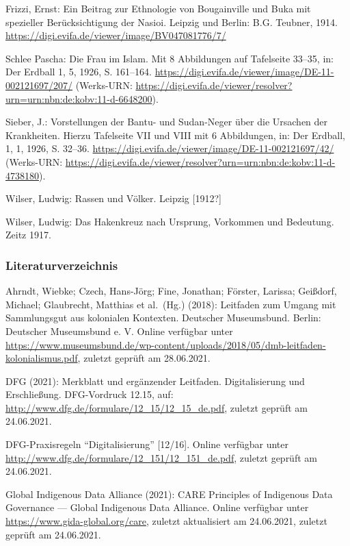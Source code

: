 \documentclass[a4paper,
fontsize=11pt,
oneside,
numbers=noperiodatend,
parskip=half-,
bibliography=totoc,
final
]{scrartcl}
\begin{document}
Frizzi, Ernst: Ein Beitrag zur Ethnologie von Bougainville und Buka mit
spezieller Berücksichtigung der Nasioi. Leipzig und Berlin: B.G.
Teubner, 1914. \url{https://digi.evifa.de/viewer/image/BV047081776/7/}

Schlee Pascha: Die Frau im Islam. Mit 8 Abbildungen auf Tafelseite
33--35, in: Der Erdball 1, 5, 1926, S. 161--164.
\url{https://digi.evifa.de/viewer/image/DE-11-002121697/207/}
(Werks-URN:
\url{https://digi.evifa.de/viewer/resolver?urn=urn:nbn:de:kobv:11-d-6648200}).

Sieber, J.: Vorstellungen der Bantu- und Sudan-Neger über die Ursachen
der Krankheiten. Hierzu Tafelseite VII und VIII mit 6 Abbildungen, in:
Der Erdball, 1, 1, 1926, S. 32--36.
\url{https://digi.evifa.de/viewer/image/DE-11-002121697/42/} (Werks-URN:
\url{https://digi.evifa.de/viewer/resolver?urn=urn:nbn:de:kobv:11-d-4738180}).

Wilser, Ludwig: Rassen und Völker. Leipzig {[}1912?{]}

Wilser, Ludwig: Das Hakenkreuz nach Ursprung, Vorkommen und Bedeutung.
Zeitz 1917.

\hypertarget{literaturverzeichnis}{%
\subsubsection{Literaturverzeichnis}\label{literaturverzeichnis}}

Ahrndt, Wiebke; Czech, Hans-Jörg; Fine, Jonathan; Förster, Larissa;
Geißdorf, Michael; Glaubrecht, Matthias et al.~(Hg.) (2018): Leitfaden
zum Umgang mit Sammlungsgut aus kolonialen Kontexten. Deutscher
Museumsbund. Berlin: Deutscher Museumsbund e. V. Online verfügbar unter
\url{https://www.museumsbund.de/wp-content/uploads/2018/05/dmb-leitfaden-kolonialismus.pdf},
zuletzt geprüft am 28.06.2021.

DFG (2021): Merkblatt und ergänzender Leitfaden. Digitalisierung und
Erschließung. DFG-Vordruck 12.15, auf:
\url{http://www.dfg.de/formulare/12_15/12_15_de.pdf}, zuletzt geprüft am
24.06.2021.

DFG-Praxisregeln \enquote{Digitalisierung} {[}12/16{]}. Online verfügbar
unter \url{http://www.dfg.de/formulare/12_151/12_151_de.pdf}, zuletzt
geprüft am 24.06.2021.

Global Indigenous Data Alliance (2021): CARE Principles of Indigenous
Data Governance --- Global Indigenous Data Alliance. Online verfügbar
unter \url{https://www.gida-global.org/care}, zuletzt aktualisiert am
24.06.2021, zuletzt geprüft am 24.06.2021.
\end{document}
